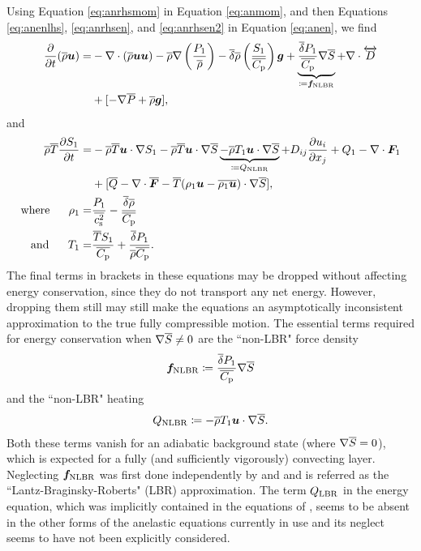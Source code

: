 \documentclass[12pt]{article}
\newcommand{\vecf}{\bm{F}}
\newcommand{\deltaref}{\overline{\delta}}
\newcommand{\cpref}{\overline{\cpcap}}
\newcommand{\cssqref}{\overline{\cs^2}}
\begin{document}
Using Equation \eqref{eq:anrhsmom} in Equation \eqref{eq:anmom}, and then Equations \eqref{eq:anenlhs}, \eqref{eq:anrhsen}, and \eqref{eq:anrhsen2} in Equation \eqref{eq:anen}, we find
	\begin{align}\label{eq:anmommod}
		\pderiv{}{t}(\rhoref\vecu)= &-\Div(\rhoref\vecu\vecu) -\rhoref\nabla\left(\frac{P_1}{\rhoref}\right) - \deltaref \rhoref \left(\frac{S_1}{\cpref}\right) \vecg + \underbrace{\frac{\deltaref P_1}{\cpref} \nabla\sref}_{\define \bm{f}_{\rm NLBR}}+\Div \overleftrightarrow{D}\nonumber\\
		&+[-\nabla\prsref + \rhoref\vecg],
	\end{align}
and
\begin{subequations}\label{eq:anenmod}
\begin{align}
	\rhoref\tmpref\pderiv{S_1}{t}= &-\rhoref\tmpref\ugrad S_1 - \rhoref \tmpref \ugrad \sref \underbrace{- \rhoref T_1\ugrad\sref}_{\define Q_{\rm NLBR}}+D_{ij}\pderiv{u_i}{x_j} + Q _1- \Div\vecf_1  \nonumber\\
	& +[\qref - \Div\overline{\vecf} - \tmpref(\rho_1\vecu-\overline{\rho_1\vecu})\cdot\nabla\sref],\\
	\where \rho_1 =& \frac{P_1}{\cssqref}-\frac{\deltaref\rhoref}{\cpref}\\
	\andd T_1 = & \frac{\tmpref S_1}{\cpref} + \frac{\deltaref P_1}{\rhoref\cpref}.
\end{align}
\end{subequations}
The final terms in brackets in these equations may be dropped without affecting energy conservation, since they do not transport any net energy. However, dropping them still may still make the equations an asymptotically inconsistent approximation to the true fully compressible motion. The essential terms required for energy conservation when $\nabla\overline{S}\neq0$ are the ``non-LBR" force density
\begin{align}\label{eq:nlbrmom}
	\bm{f}_{\rm NLBR} \define \frac{\deltaref P_1}{\cpref} \nabla\sref
\end{align}
and the ``non-LBR" heating
\begin{align}\label{eq:nlbrheat}
	Q_{\rm NLBR} \coloneqq -\overline{\rho} T_1\bm{u}\cdot\nabla\overline{S}.
\end{align}
Both these terms vanish for an adiabatic background state (where $\nabla\overline{S}=0$), which is expected for a fully (and sufficiently vigorously) convecting layer.  Neglecting $\bm{f}_{\rm NLBR}$ was first done independently by \citet{Lantz1992} and \citet{Braginsky1995} and is referred as the ``Lantz-Braginsky-Roberts" (LBR) approximation. The term $Q_{\rm LBR}$ in the energy equation, which was implicitly contained in the equations of \citet{Gough1969}, seems to be absent in the other forms of the anelastic equations currently in use and its neglect seems to have not been explicitly considered. 
\end{document}
